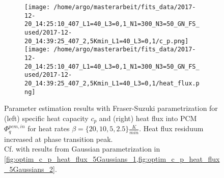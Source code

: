 \documentclass{scrartcl}[12pt, halfparskip]
\numberwithin{equation}{section}
\numberwithin{figure}{section}
\numberwithin{table}{section}
\begin{document}
\begin{figure}[H]
	\begin{subfigure}{1.\textwidth}
		\texttt{[image: /home/argo/masterarbeit/fits\_data/2017-12-20\_14:25:10\_407\_L1=40\_L3=0,1\_N1=300\_N3=50\_GN\_FS\_used/2017-12-20\_14:39:25\_407\_2,5Kmin\_L1=40\_L3=0,1/c\_p.png]}
		\texttt{[image: /home/argo/masterarbeit/fits\_data/2017-12-20\_14:25:10\_407\_L1=40\_L3=0,1\_N1=300\_N3=50\_GN\_FS\_used/2017-12-20\_14:39:25\_407\_2,5Kmin\_L1=40\_L3=0,1/heat\_flux.png]}
	\end{subfigure}
	\caption{Parameter estimation results with Fraser-Suzuki parametrization for (left) specific heat capacity $c_p$ and (right) heat flux into PCM $\varPhi_q^{pcm,in}$ for heat rates $\beta=\{ 20, 10, 5, 2.5 \} \frac{K}{min}$. Heat flux residuum increased at phase transition peak. \\
	Cf. with results from Gaussian parametrization in \cref{fig:optim_c_p_heat_flux_5Gaussians_1,fig:optim_c_p_heat_flux_5Gaussians_2}.}
	\label{fig:optim_c_p_heat_flux_FS_1}
\end{figure}
\end{document}
